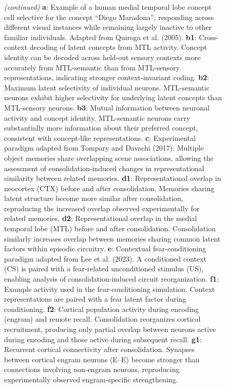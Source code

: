 \documentclass{article}
\begin{document}
\begin{figure}[h!]
  \ContinuedFloat
  \captionsetup{list=off} %
  \caption{\textit{(continued)} 
\textbf{a}: Example of a human medial temporal lobe concept cell selective for the concept “Diego Maradona”, responding across different visual instances while remaining largely inactive to other familiar individuals. Adapted from Quiroga et al. (2005).
\textbf{b1}: Cross-context decoding of latent concepts from MTL activity. Concept identity can be decoded across held-out sensory contexts more accurately from MTL-semantic than from MTL-sensory representations, indicating stronger context-invariant coding.
\textbf{b2}: Maximum latent selectivity of individual neurons. MTL-semantic neurons exhibit higher selectivity for underlying latent concepts than MTL-sensory neurons.
\textbf{b3}: Mutual information between neuronal activity and concept identity. MTL-semantic neurons carry substantially more information about their preferred concept, consistent with concept-like representations.
\textbf{c}: Experimental paradigm adapted from Tompary and Davachi (2017). Multiple object memories share overlapping scene associations, allowing the assessment of consolidation-induced changes in representational similarity between related memories.
\textbf{d1}: Representational overlap in neocortex (CTX) before and after consolidation. Memories sharing latent structure become more similar after consolidation, reproducing the increased overlap observed experimentally for related memories.
\textbf{d2}: Representational overlap in the medial temporal lobe (MTL) before and after consolidation. Consolidation similarly increases overlap between memories sharing common latent factors within episodic circuitry.
\textbf{e}: Contextual fear-conditioning paradigm adapted from Lee et al. (2023). A conditioned context (CS) is paired with a fear-related unconditioned stimulus (US), enabling analysis of consolidation-induced circuit reorganization.
\textbf{f1}: Example activity used in the fear-conditioning simulation. Context representations are paired with a fear latent factor during conditioning.
\textbf{f2}: Cortical population activity during encoding (engram) and remote recall. Consolidation reorganizes cortical recruitment, producing only partial overlap between neurons active during encoding and those active during subsequent recall.
\textbf{g1}: Recurrent cortical connectivity after consolidation. Synapses between cortical engram neurons (E–E) become stronger than connections involving non-engram neurons, reproducing experimentally observed engram-specific strengthening.
}
\end{figure}
\end{document}
